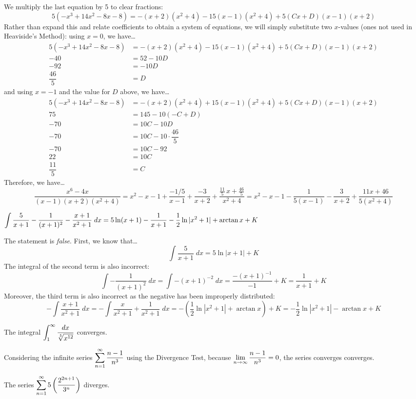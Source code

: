 \documentclass[11pt,letterpaper]{article}
\begin{document}
We multiply the last equation by 5 to clear fractions:
	\[
	5(-x^3 + 14x^2 - 8x - 8)= -(x + 2)(x^2 + 4) - 15(x - 1)(x^2 + 4) + 5(Cx + D)(x - 1)(x + 2)
	\]
Rather than expand this and relate coefficients to obtain a system of equations, we will simply substitute two $x$-values (ones not used in Heaviside's Method): using $x= 0$, we have\dots
	\[
	\begin{aligned}
	5(-x^3 + 14x^2 - 8x - 8)&= -(x + 2)(x^2 + 4) - 15(x - 1)(x^2 + 4) + 5(Cx + D)(x - 1)(x + 2) \\
	-40&= 52 - 10D \\
	-92&= -10 D \\
	\dfrac{46}{5}&= D
	\end{aligned}
	\]
and using $x= -1$ and the value for $D$ above, we have\dots
	\[
	\begin{aligned}
	5(-x^3 + 14x^2 - 8x - 8)&= -(x + 2)(x^2 + 4) + 15(x - 1)(x^2 + 4) + 5(Cx + D)(x - 1)(x + 2) \\
	75&= 145 - 10 (-C + D) \\
	-70&= 10C - 10D \\
	-70&= 10C - 10 \cdot \dfrac{46}{5} \\
	-70&= 10C - 92 \\
	22&= 10C \\
	\dfrac{11}{5}&= C
	\end{aligned}
	\]
Therefore, we have\dots
	\[
	\dfrac{x^6 - 4x}{(x - 1)(x + 2)(x^2 + 4)}= x^2 - x - 1 + \dfrac{-1/5}{x - 1} + \dfrac{-3}{x + 2} + \dfrac{\frac{11}{5}\,x + \frac{46}{5}}{x^2 + 4}= x^2 - x - 1 - \dfrac{1}{5(x - 1)} - \dfrac{3}{x + 2} + \dfrac{11x + 46}{5(x^2 + 4)}
	\] \pvspace{1.3cm}



 $\displaystyle\int \dfrac{5}{x + 1} - \dfrac{1}{(x + 1)^2} - \dfrac{x + 1}{x^2 + 1} \;dx= 5 \ln(x + 1) - \dfrac{1}{x + 1} - \frac{1}{2} \ln|x^2 + 1| + \arctan x + K$ \pspace

\sol The statement is \textit{false}. First, we know that\dots
	\[
	\int \dfrac{5}{x + 1} \;dx= 5 \ln|x + 1| + K
	\]
The integral of the second term is also incorrect:
	\[
	\int -\dfrac{1}{(x + 1)^2} \;dx= \int -(x + 1)^{-2} \;dx= \dfrac{-(x + 1)^{-1}}{-1} + K= \dfrac{1}{x + 1} + K
	\]
Moreover, the third term is also incorrect as the negative has been improperly distributed:
	\[
	- \int \dfrac{x + 1}{x^2 + 1} \;dx= -\int \dfrac{x}{x^2 + 1} + \dfrac{1}{x^2 + 1} \;dx= - \left( \frac{1}{2} \ln|x^2 + 1| + \arctan x \right) + K= -\frac{1}{2} \ln|x^2 + 1| - \arctan x + K
	\]



 The integral $\displaystyle\int_1^\infty \dfrac{dx}{\sqrt[5]{x^{12}}}$ converges. \pspace



 Considering the infinite series $\displaystyle\sum_{n=1}^\infty \dfrac{n - 1}{n^3}$ using the Divergence Test, because $\displaystyle\lim_{n \to \infty} \dfrac{n - 1}{n^3}= 0$, the series converges converges.


 The series $\displaystyle\sum_{n=1}^\infty 5 \left( \dfrac{2^{2n+1}}{3^n} \right)$ diverges. 
\end{document}
